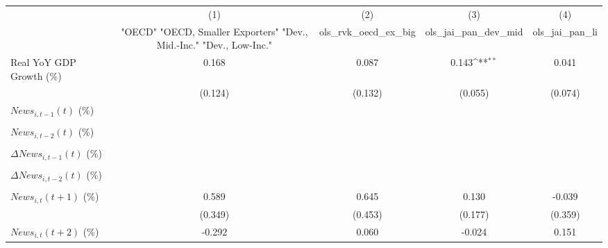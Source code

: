 {
\def\sym#1{\ifmmode^{#1}\else\(^{#1}\)\fi}
\begin{tabular}{l*{4}{c}}
\toprule
                    &\multicolumn{1}{c}{(1)}&\multicolumn{1}{c}{(2)}&\multicolumn{1}{c}{(3)}&\multicolumn{1}{c}{(4)}\\
                    &\multicolumn{1}{c}{ "OECD" "OECD, Smaller Exporters" "Dev., Mid.-Inc." "Dev., Low-Inc."}&\multicolumn{1}{c}{ols_rvk_oecd_ex_big}&\multicolumn{1}{c}{ols_jai_pan_dev_mid}&\multicolumn{1}{c}{ols_jai_pan_li}\\
\midrule
Real YoY GDP Growth (\%)&       0.168         &       0.087         &       0.143\sym{**} &       0.041         \\
                    &     (0.124)         &     (0.132)         &     (0.055)         &     (0.074)         \\
\addlinespace
$ News_{i,t-1}(t)$ (\%)&                     &                     &                     &                     \\
                    &                     &                     &                     &                     \\
\addlinespace
$ News_{i,t-2}(t)$ (\%)&                     &                     &                     &                     \\
                    &                     &                     &                     &                     \\
\addlinespace
$ \Delta News_{i,t-1}(t)$ (\%)&                     &                     &                     &                     \\
                    &                     &                     &                     &                     \\
\addlinespace
$ \Delta News_{i,t-2}(t)$ (\%)&                     &                     &                     &                     \\
                    &                     &                     &                     &                     \\
\addlinespace
$ News_{i,t}(t+1)$ (\%)&       0.589         &       0.645         &       0.130         &      -0.039         \\
                    &     (0.349)         &     (0.453)         &     (0.177)         &     (0.359)         \\
\addlinespace
$ News_{i,t}(t+2)$ (\%)&      -0.292         &       0.060         &      -0.024         &       0.151         \\

\end{tabular}}
